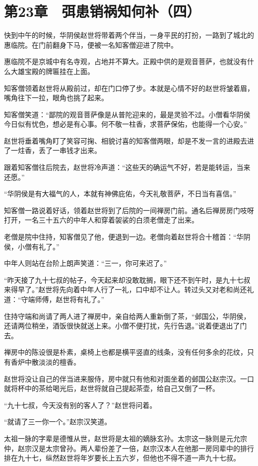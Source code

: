 \section{第23章　弭患销祸知何补（四）}

快到中午的时候，华阴侯赵世将带着两个伴当，一身平民的打扮，一路到了城北的惠临院。在门前翻身下马，便被一名知客僧迎进了院中。

惠临院不是京城中有名寺观，占地并不算大。正殿中供的是观音菩萨，也就没有什么大雄宝殿的牌匾挂在上面。

知客僧领着赵世将从殿前过，却在门口停了步。本就是心情不好的赵世将皱着眉，嘴角往下一拉，眼角也挑了起来。

知客僧笑道：“鄙院的观音菩萨像是从普陀迎来的，最是灵验不过。小僧看华阴侯今日似有忧色，想必是有心事。何不敬一柱香，求菩萨保佑，也能得一个心安。”

赵世将垂着嘴角盯了笑容可掬、相貌讨喜的知客僧两眼，却是不发一言的进殿去进了一炷香，丢了一串钱才出来。

跟着知客僧往后院去，赵世将冷声道：“这些天的确运气不好，若是能转运，当来还愿。”

“华阴侯是有大福气的人，本就有神佛庇佑，今天礼敬菩萨，不日当有喜信。”

知客僧一路说着好话，领着赵世将到了后院的一间禅房门前。通名后禅房房门吱呀打开，一名三十五六的中年人和穿着袈裟的白须老僧走了出来。

老僧是院中住持，知客僧见了他，便退到一边。老僧向着赵世将合十稽首：“华阴侯，小僧有礼了。”

中年人则站在台阶上朗声笑道：“三一，你可来迟了。”

“昨天接了九十七叔的帖子，今天起来却没敢耽搁，眼下还不到午时，是九十七叔来得早了。”赵世将先向着中年人行了一礼，口中却不让人。转过头又对老和尚还礼道：“守端师傅，赵世将有礼了。”

住持守端和尚请了两人进了禅房中，亲自给两人重新倒了茶，“邺国公，华阴侯，还请两位稍坐，酒饭很快就送上来。小僧不便打扰，先行告退。”说着便退出了门去。

禅房中的陈设很是朴素，桌椅上也都是横平竖直的线条，没有任何多余的花纹，只有香炉中散淡淡的檀香。

赵世将没让自己的伴当进来服侍，房中就只有他和对面坐着的邺国公赵宗汉。一口就将杯中的茶给喝光后，赵世将就自己提起茶壶，给自己又倒了一杯。

“九十七叔，今天没有别的客人了？”赵世将问着。

“就请了三一你一个。”赵宗汉笑道。

太祖一脉的字辈是德惟从世，赵世将是太祖的嫡脉玄孙。太宗这一脉则是元允宗仲，赵宗汉是太宗曾孙。两人辈份差了一倍，赵宗汉本人在他那一房同辈中的排行排在九十七，纵然赵世将年岁要长上五六岁，但他也不得不道一声九十七叔。

